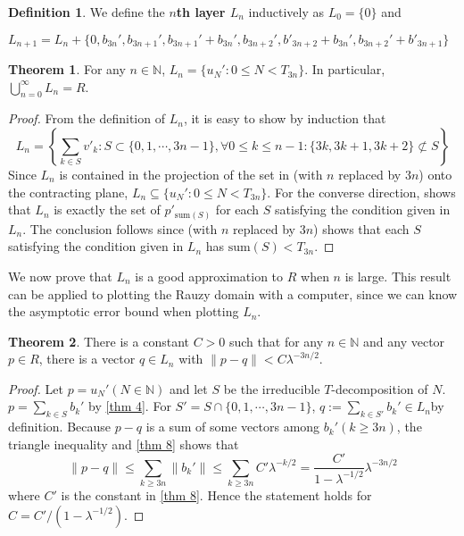\documentclass{article}
\theoremstyle{definition}
\newtheorem{theorem}{Theorem}
\newtheorem*{definition}{Definition}
\begin{document}
\begin{definition}
    We define the \textbf{$n$th layer $L_n$} inductively as $L_0=\{0\} $ and
    \begin{center}
        $L_{n+1}=L_n+\{0, b_{3n}', b_{3n+1}', b_{3n+1}'+b_{3n}',b_{3n+2}', b'_{3n+2}+b_{3n}',b_{3n+2}'+b'_{3n+1}\}$
    \end{center}
\end{definition}
\begin{theorem}
\label{thm 10}
For any $n\in \mathbb{N}$, $L_n=\{u_N':0\leq N< T_{3n}\}$. In particular, $\bigcup_{n=0}^\infty L_n=R$.
\end{theorem}
\begin{proof}
    From the definition of $L_n$, it is easy to show by induction that \[
    L_n=\left\{\sum_{k\in S}v'_k : S\subset\{0,1,\cdots,3n-1\}, \forall 0\leq k\leq n-1:\{3k, 3k+1, 3k+2\} \not\subset S \right\}
    \]
    Since $L_n$ is contained in the projection of the set in  (with $n$ replaced by $3n$) onto the contracting plane, $L_n\subseteq \{u_N':0\leq N< T_{3n}\}$. For the converse direction,  shows that $L_n$ is exactly the set of $p'_{\text{sum}(S)}$ for each $S$ satisfying the condition given in $L_n$. The conclusion follows since  (with $n$ replaced by $3n$) shows that each $S$ satisfying the condition given in $L_n$ has $\text{sum}(S)<T_{3n}$. 
\end{proof}

We now prove that $L_n$ is a good approximation to $R$ when $n$ is large. This result can be applied to plotting the Rauzy domain with a computer, since we can know the asymptotic error bound when plotting $L_n$.

\begin{theorem}
\label {thm 11}
There is a constant $C>0$ such that for any $n\in\mathbb{N}$ and any vector $p\in R$, there is a vector $q\in L_n$ with $\| p-q\|<C\lambda^{-3n/2}$.
\end{theorem}

\begin{proof}
Let $p=u_N'(N\in\mathbb{N})$ and let $S$ be the irreducible $T$-decomposition of $N$. $p=\sum_{k\in S}b_k'$ by \cref{thm 4}. For $S'=S\cap\{0,1,\cdots,3n-1\}$, $q:=\sum_{k\in S'}b_k'\in L_n$by definition. Because $p-q$ is a sum of some vectors among $b_{k}'(k\geq 3n)$, the triangle inequality and \cref{thm 8} shows that
\[
\|p-q\|\leq\sum_{k\geq 3n}\|b_k' \|\leq\sum_{k\geq 3n}C'\lambda^{-k/2}=\frac{C'}{1-\lambda^{-1/2}}\lambda^{-3n/2}
\]
where $C'$ is the constant in \cref{thm 8}. Hence the statement holds for $C=C'/(1-\lambda^{-1/2})$.
\end{proof}
\end{document}
